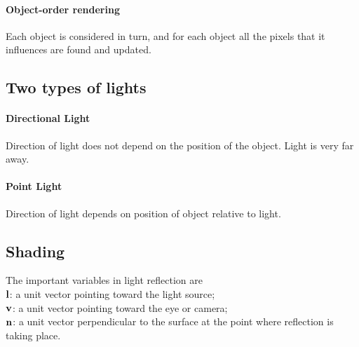 \documentclass[11pt]{article}
\numberwithin{equation}{section}
\begin{document}
\paragraph{Object-order rendering}
Each object is considered in turn, and for each object all the pixels that it influences are found and updated.

\subsection{Two types of lights}
\paragraph{Directional Light}
Direction of light does not depend on the position of the object. Light is very far away.

\paragraph{Point Light}
Direction of light depends on position of object relative to light.

\subsection{Shading \label{Shading}}
\notation
The important variables in light reflection are \\
 $\textbf{l}$: a unit vector pointing toward the light source;\\
 $\textbf{v}$: a unit vector pointing toward the eye or camera;\\
 $\textbf{n}$: a unit vector perpendicular to the surface at the point where reflection is taking place.
\end{document}
